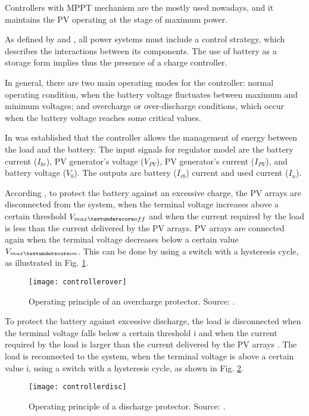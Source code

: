 Controllers with MPPT mechanism are the mostly used nowadays,  and it maintains the PV operating at the stage of maximum power.

As defined by \cite{Hansen} and \cite{Mellit}, all power systems must include a control strategy, which describes the interactions between its components. The use of battery as a storage form implies thus the presence of a charge controller. 

In general, there are two main operating modes for the controller: normal operating condition, when the battery voltage fluctuates between maximum and minimum voltages; and overcharge or over-discharge conditions, which occur when the battery voltage reaches some critical values. 

In \cite{Mellit} was established that the controller allows the management of energy between the load and the battery. The input signals for regulator model are the battery current ($ I_{br} $), PV generator's voltage ($ V_{PV} $), PV generator's current ($ I_{PV} $), and battery voltage ($ V_{b} $). The outputs are battery ($ I_{rb} $) current and used current ($ I_{u} $). 

According \cite{Hansen}, to protect the battery against an excessive charge, the PV arrays are disconnected from the system, when the terminal voltage increases above a certain threshold $ V_{max \textunderscore off} $ and when the current required by the load is less than the current delivered by the PV arrays. PV arrays are connected again when the terminal voltage decreases below a certain value $ V_{max \textunderscore on} $. This can be done by using a switch with a hysteresis cycle, as illustrated in Fig. \ref{fig:controllerover}. 

\begin{figure}[h]
\texttt{[image: controllerover]}
\centering
\caption{Operating principle of an overcharge protector. Source: \cite{Hansen}.}
\label{fig:controllerover}
\end{figure}

To protect the battery against excessive discharge, the load is disconnected when the terminal voltage falls below a certain threshold i and when the current required by the load is larger than the current delivered by the PV arrays \cite{Hansen}. The load is reconnected to the system, when the terminal voltage is above a certain value i, using a switch with a hysteresis cycle, as shown in Fig. \ref{fig:controllerdisc}. 

\begin{figure}[h]
\texttt{[image: controllerdisc]}
\centering
\caption{Operating principle of a discharge protector. Source: \cite{Hansen}.}
\label{fig:controllerdisc}
\end{figure}

